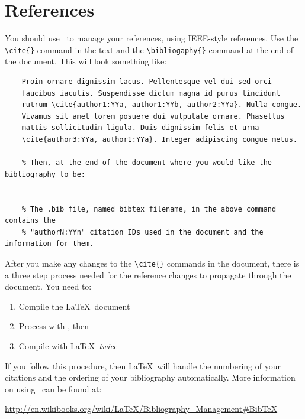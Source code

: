 \documentclass[11pt]{article}
\begin{document}
\section{References}
\label{sec:references}
\vspace{-0.2in}
%
You should use \BibTeX\ to manage your references, using IEEE-style references. Use the {\tt \textbackslash cite\{\}} command in the text and the {\tt \textbackslash bibliogaphy\{\}} command at the end of the document. This will look something like:
%
	\begin{verbatim}
	Proin ornare dignissim lacus. Pellentesque vel dui sed orci
	faucibus iaculis. Suspendisse dictum magna id purus tincidunt
	rutrum \cite{author1:YYa, author1:YYb, author2:YYa}. Nulla congue.
	Vivamus sit amet lorem posuere dui vulputate ornare. Phasellus
	mattis sollicitudin ligula. Duis dignissim felis et urna
	\cite{author3:YYa, author1:YYa}. Integer adipiscing congue metus.

	% Then, at the end of the document where you would like the bibliography to be:
	
	
	% The .bib file, named bibtex_filename, in the above command contains the  
	% "authorN:YYn" citation IDs used in the document and the information for them.

	\end{verbatim}
%
\vspace{-0.2in}
After you make any changes to the {\tt \textbackslash cite\{\}} commands in the document, there is a three step process needed for the reference changes to propagate through the document. You need to:
	\vspace{-0.2in}
	\begin{enumerate}
		\item Compile the \LaTeX\ document
		\item Process with \BibTeX, then
		\item Compile with \LaTeX\ \textit{twice}
	\end{enumerate}
	\vspace{-0.2in}
If you follow this procedure, then \LaTeX\ will handle the numbering of your citations and the ordering of your bibliography automatically. More information on using \BibTeX\ can be found at:

\hspace{0.25in}\url{http://en.wikibooks.org/wiki/LaTeX/Bibliography_Management#BibTeX}


\end{document}
